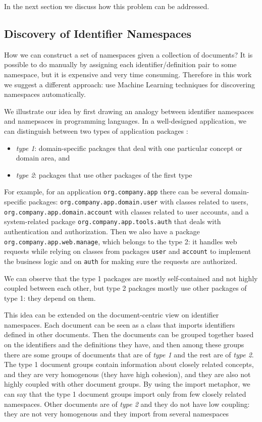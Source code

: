 In the next section we discuss how this problem can be addressed.


\subsection{Discovery of Identifier Namespaces}


How we can construct a set of namespaces given a collection of documents?
It is possible to do manually by assigning each identifier/definition pair
to some namespace, but it is expensive and very time consuming. Therefore
in this work we suggest a different approach: use Machine Learning techniques 
for discovering namespaces automatically.

We illustrate our idea by first drawing an analogy between identifier
namespaces and namepsaces in programming languages.
In a well-designed application, we can distinguish between two types of
application packages \cite{evans2004domain}:

\begin{itemize}
  \item \emph{type 1}: domain-specific packages that deal with one particular
    concept or domain area, and
  \item \emph{type 2}: packages that use other packages of
    the first type
\end{itemize}

For example, for an application \verb|org.company.app|
there can be several domain-specific packages: \verb|org.company.app.domain.user|
with classes related to users, \verb|org.company.app.domain.account|
with classes related to user accounts, and a system-related package
\verb|org.company.app.tools.auth| that deals with authentication and
authorization. Then we also have a package \verb|org.company.app.web.manage|,
which belongs to the type 2: it handles web requests
while relying on classes from packages \verb|user| and \verb|account| to
implement the business logic and on \verb|auth| for making sure the
requests are authorized.

We can observe that the type 1 packages are mostly self-contained
and not highly coupled between each other, but type 2 packages mostly
use other packages of type 1: they depend on them.

This idea can be extended on the document-centric view on
identifier namespaces. Each document can be seen as a class that
imports identifiers defined in other documents.
Then the documents can be grouped together based on the identifiers
and the definitions they have, and then among these groups
there are some groups of documents that are of \emph{type 1}
and the rest are of \emph{type 2}. The type 1 document groups
contain information about closely related concepts, and they are
very homogenous (they have high cohesion), and they are also
not highly coupled with other document groups.
By using the import metaphor, we can say that the type 1 document groups
import only from few closely related namespaces.
Other documents are of \emph{type 2} and they do not have
low coupling: they are not very homogenous and they import from several namespaces

